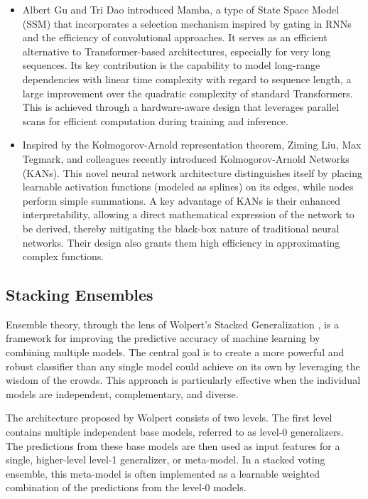 \begin{itemize}
    \item \textbf{\cite{Gu2023}}
    Albert Gu and Tri Dao introduced Mamba, a type of State Space Model (SSM) that incorporates a selection mechanism inspired by gating in RNNs and the efficiency of convolutional approaches. It serves as an efficient alternative to Transformer-based architectures, especially for very long sequences. Its key contribution is the capability to model long-range dependencies with linear time complexity with regard to sequence length, a large improvement over the quadratic complexity of standard Transformers. This is achieved through a hardware-aware design that leverages parallel scans for efficient computation during training and inference. 
    
    \item \textbf{\cite{Liu2024}}
    Inspired by the Kolmogorov-Arnold representation theorem, Ziming Liu, Max Tegmark, and colleagues recently introduced Kolmogorov-Arnold Networks (KANs). This novel neural network architecture distinguishes itself by placing learnable activation functions (modeled as splines) on its edges, while nodes perform simple summations. A key advantage of KANs is their enhanced interpretability, allowing a direct mathematical expression of the network to be derived, thereby mitigating the black-box nature of traditional neural networks. Their design also grants them high efficiency in approximating complex functions.
\end{itemize}

\subsection{Stacking Ensembles}

Ensemble theory, through the lens of Wolpert's Stacked Generalization \citep{Wolpert1992}, is a framework for improving the predictive accuracy of machine learning by combining multiple models. The central goal is to create a more powerful and robust classifier than any single model could achieve on its own by leveraging the wisdom of the crowds. This approach is particularly effective when the individual models are independent, complementary, and diverse.

The architecture proposed by Wolpert consists of two levels. The first level contains multiple independent base models, referred to as level-0 generalizers. The predictions from these base models are then used as input features for a single, higher-level level-1 generalizer, or meta-model. In a stacked voting ensemble, this meta-model is often implemented as a learnable weighted combination of the predictions from the level-0 models.


